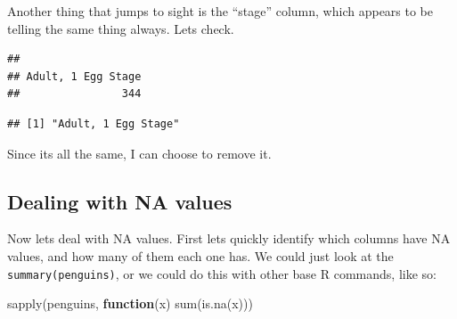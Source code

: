 \documentclass[
]{book}
\newenvironment{Shaded}{\begin{snugshade}}{\end{snugshade}}
\newcommand{\ConstantTok}[1]{\textcolor[rgb]{0.00,0.00,0.00}{#1}}
\newcommand{\ControlFlowTok}[1]{\textcolor[rgb]{0.13,0.29,0.53}{\textbf{#1}}}
\newcommand{\FunctionTok}[1]{\textcolor[rgb]{0.00,0.00,0.00}{#1}}
\newcommand{\NormalTok}[1]{#1}
\newcommand{\OtherTok}[1]{\textcolor[rgb]{0.56,0.35,0.01}{#1}}
\newcommand{\SpecialCharTok}[1]{\textcolor[rgb]{0.00,0.00,0.00}{#1}}
\begin{document}
Another thing that jumps to sight is the ``stage'' column, which appears to be telling the same thing always.
Lets check.

\begin{Shaded}
\end{Shaded}

\begin{verbatim}
## 
## Adult, 1 Egg Stage 
##                344
\end{verbatim}

\begin{Shaded}
\end{Shaded}

\begin{verbatim}
## [1] "Adult, 1 Egg Stage"
\end{verbatim}

Since its all the same, I can choose to remove it.

\begin{Shaded}
\end{Shaded}

\hypertarget{dealing-with-na-values}{%
\subsection{Dealing with NA values}\label{dealing-with-na-values}}

Now lets deal with NA values.
First lets quickly identify which columns have NA values, and how many of them each one has.
We could just look at the \texttt{summary(penguins)}, or we could do this with other base R commands, like so:

\begin{Shaded}
\begin{Highlighting}[]
\FunctionTok{sapply}\NormalTok{(penguins, }\ControlFlowTok{function}\NormalTok{(x) }\FunctionTok{sum}\NormalTok{(}\FunctionTok{is.na}\NormalTok{(x)))}
\end{Highlighting}
\end{Shaded}
\end{document}
